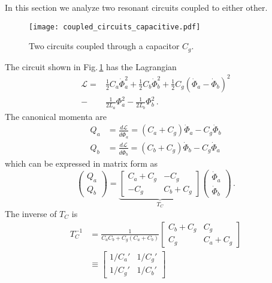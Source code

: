 
In this section we analyze two resonant circuits coupled to either other.


\begin{figure}
\begin{centering}
\texttt{[image: coupled\_circuits\_capacitive.pdf]}
\par\end{centering}
\caption{Two circuits coupled through a capacitor $C_g$.}
\label{Fig:coupledCircuits_capacitive}
\end{figure}

The circuit shown in Fig.\,\ref{Fig:coupledCircuits_capacitive} has the Lagrangian
\begin{align}
  \mathcal{L}
  =& \frac{1}{2}C_a\dot{\Phi}_a^2 + \frac{1}{2}C_b\dot{\Phi}_b^2
   + \frac{1}{2}C_g \left( \dot{\Phi}_a - \dot{\Phi}_b \right)^2 \nonumber \\
  -& \frac{1}{2L_a}\Phi_a^2 - \frac{1}{2L_b}\Phi_b^2 \, .
\end{align}
The canonical momenta are
\begin{align}
  Q_a &= \frac{d \mathcal{L}}{d\dot{\Phi}_a} = (C_a + C_g) \dot{\Phi}_a - C_g\dot{\Phi}_b \nonumber \\
  Q_b &= \frac{d \mathcal{L}}{d\dot{\Phi}_b} = (C_b + C_g) \dot{\Phi}_b - C_g\dot{\Phi}_a
\end{align}
which can be expressed in matrix form as
\begin{equation}
  \left( \begin{array}{c} Q_a \\ Q_b \end{array} \right) =
  \underbrace{
    \left[ \begin{array}{cc} C_a + C_g & -C_g \\ -C_g & C_b + C_g \end{array} \right]}_{T_C}
  \left( \begin{array}{c} \dot{\Phi}_a \\ \dot{\Phi}_b \end{array} \right)
  \, .
\end{equation}
The inverse of $T_C$ is
\begin{align}
  T_C^{-1}
  &= \frac{1}{C_a C_b + C_g (C_a + C_b)}
    \left[ \begin{array}{cc} C_b + C_g & C_g \\ C_g & C_a + C_g \end{array} \right] \nonumber \\
  &\equiv \left[
    \begin{array}{cc} 1/C_a' & 1/C_g' \\ 1/C_g' & 1/C_b' \end{array}
    \right]
\end{align}
